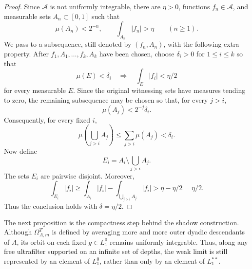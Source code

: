 \documentclass[11pt,reqno]{amsart}
\makeatletter
\theoremstyle{plain}
\theoremstyle{definition}
\newcounter{problempaper}
\newenvironment{problempaperbody}{%
  \setcounter{subsection}{0}%
  \setcounter{subsubsection}{0}%
  \setcounter{paragraph}{0}%
  \renewcommand{\thesubsection}{\arabic{subsection}}%
  \renewcommand{\thesubsubsection}{\thesubsection.\arabic{subsubsection}}%
  \renewcommand{\theparagraph}{\thesubsubsection.\arabic{paragraph}}%
  \let\problem@outersection\section
  \let\problem@outersubsection\subsection
  \let\problem@outersubsubsection\subsubsection
  \let\problem@outerparagraph\paragraph
  \let\section\problem@papersection
  \let\subsection\problem@papersubsection
  \let\subsubsection\problem@papersubsubsection
}{%
  \let\section\problem@outersection
  \let\subsection\problem@outersubsection
  \let\subsubsection\problem@outersubsubsection
  \let\paragraph\problem@outerparagraph
}
\newcommand{\problem@target}[2]{%
  \hypertarget{problem-\theproblempaper-#1-#2}{}%
}
\newcommand{\problem@paperheading}[3]{%
  \par\bigskip
  \problem@target{#1}{#2}%
  \noindent{\large\bfseries #2.\quad #3\par}%
  \nobreak\smallskip
}
\newcommand{\problem@papersubheading}[3]{%
  \par\medskip
  \problem@target{#1}{#2}%
  \noindent{\normalsize\bfseries #2.\quad #3\par}%
  \nobreak\smallskip
}
\newcommand{\problem@papersubsubheading}[3]{%
  \par\smallskip
  \problem@target{#1}{#2}%
  \noindent{\normalsize\itshape #2.\quad #3.\ }%
}
\def\problem@papersection{%
  \@ifstar{\problem@papersectionstar}{\problem@papersectionnostar}%
}
\def\problem@papersectionstar#1{%
  \par\bigskip\noindent{\large\bfseries #1\par}\nobreak\smallskip
}
\def\problem@papersectionnostar#1{%
  \refstepcounter{subsection}%
  \setcounter{subsubsection}{0}%
  \setcounter{paragraph}{0}%
  \problem@paperheading{section}{\thesubsection}{#1}%
  \problem@writecontentsline{section}{\thesubsection}{#1}%
}
\def\problem@papersubsection{%
  \@ifstar{\problem@papersubsectionstar}{\problem@papersubsectionnostar}%
}
\def\problem@papersubsectionstar#1{%
  \par\medskip\noindent{\normalsize\bfseries #1\par}\nobreak\smallskip
}
\def\problem@papersubsectionnostar#1{%
  \refstepcounter{subsubsection}%
  \setcounter{paragraph}{0}%
  \problem@papersubheading{subsection}{\thesubsubsection}{#1}%
  \problem@writecontentsline{subsection}{\thesubsubsection}{#1}%
}
\def\problem@papersubsubsection{%
  \@ifstar{\problem@papersubsubsectionstar}{\problem@papersubsubsectionnostar}%
}
\def\problem@papersubsubsectionstar#1{%
  \par\smallskip\noindent{\normalsize\itshape #1.\ }%
}
\def\problem@papersubsubsectionnostar#1{%
  \refstepcounter{paragraph}%
  \problem@papersubsubheading{subsubsection}{\theparagraph}{#1}%
  \problem@writecontentsline{subsubsection}{\theparagraph}{#1}%
}
\newcommand{\problem@writecontentsline}[3]{%
  \begingroup
  \protected@write\@auxout{}{%
    \string\problemcontentsentry{\theproblempaper}{#1}{#2}{#3}{\thepage}%
  }%
  \endgroup
}
\newcommand{\problemcontentsentry}[5]{%
  \@ifundefined{problemcontents@#1}{%
    \expandafter\gdef\csname problemcontents@#1\endcsname{}%
  }{}%
  \expandafter\g@addto@macro\csname problemcontents@#1\endcsname{%
    \problemcontentsline{#1}{#2}{#3}{#4}{#5}%
  }%
}
\newcommand{\problemcontentslink}[4]{%
  \hyperlink{problem-#1-#2-#3}{#4}%
}
\newcommand{\problemcontentsline}[5]{%
  \ifstrequal{#2}{section}{%
    \par\noindent
    \problemcontentslink{#1}{#2}{#3}{\makebox[2.5em][l]{#3}#4}%
    \nobreak\dotfill
    \problemcontentslink{#1}{#2}{#3}{#5}\par
  }{%
    \ifstrequal{#2}{subsection}{%
      \par\noindent\hspace*{1.5em}%
      \problemcontentslink{#1}{#2}{#3}{\makebox[3.5em][l]{#3}#4}%
      \nobreak\dotfill
      \problemcontentslink{#1}{#2}{#3}{#5}\par
    }{%
      \par\noindent\hspace*{3em}%
      \problemcontentslink{#1}{#2}{#3}{\makebox[4.5em][l]{#3}#4}%
      \nobreak\dotfill
      \problemcontentslink{#1}{#2}{#3}{#5}\par
    }%
  }%
}
\makeatother
\begin{document}
\begin{problempaperbody}
\begin{proof}
Since $\mathcal A$ is not uniformly integrable, there are $\eta>0$, functions $f_n\in\mathcal A$, and measurable sets $A_n\subset[0,1]$ such that
\begin{equation*}
        \mu(A_n)<2^{-n},\qquad \int_{A_n}|f_n|>\eta\qquad(n\geq1).
\end{equation*}
We pass to a subsequence, still denoted by $(f_n,A_n)$, with the following extra property.  After $f_1,A_1,\ldots,f_k,A_k$ have been chosen, choose $\delta_i>0$ for $1\leq i\leq k$ so that
\begin{equation*}
        \mu(E)<\delta_i\quad\Longrightarrow\quad \int_E|f_i|<\eta/2
\end{equation*}
for every measurable $E$.  Since the original witnessing sets have measures tending to zero, the remaining subsequence may be chosen so that, for every $j>i$,
\begin{equation*}
        \mu(A_j)<2^{-j}\delta_i .
\end{equation*}
Consequently, for every fixed $i$,
\begin{equation*}
        \mu\left(\bigcup_{j>i}A_j\right)\leq\sum_{j>i}\mu(A_j)<\delta_i.
\end{equation*}
Now define
\begin{equation*}
        E_i=A_i\setminus\bigcup_{j>i}A_j .
\end{equation*}
The sets $E_i$ are pairwise disjoint.  Moreover,
\begin{equation*}
        \int_{E_i}|f_i|
        \geq\int_{A_i}|f_i|-\int_{\bigcup_{j>i}A_j}|f_i|
        >\eta-\eta/2=\eta/2.
\end{equation*}
Thus the conclusion holds with $\delta=\eta/2$.
\end{proof}

The next proposition is the compactness step behind the shadow construction. Although $\Omega_{A,m}^T$ is defined by averaging more and more outer dyadic descendants of $A$, its orbit on each fixed $g\in L_1^0$ remains uniformly integrable. Thus, along any free ultrafilter supported on an infinite set of depths, the weak limit is still represented by an element of $L_1^0$, rather than only by an element of $L_1^{**}$.


\end{problempaperbody}
\end{document}
